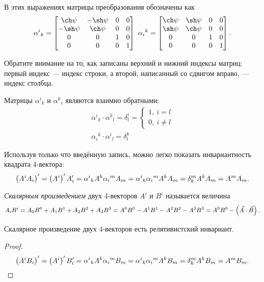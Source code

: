     В этих выражениях матрицы преобразования обозначены как 
    \[
        {\alpha^i}_k = 
        \begin{bmatrix}
            \ch \psi & -\sh\psi & 0 & 0 \\
            -\sh\psi & \ch \psi & 0 & 0 \\
            0 & 0 & 1 & 0 \\
            0 & 0 & 0 & 1
        \end{bmatrix}
        \  {\alpha_i}^k = 
        \begin{bmatrix}
            \ch\psi & \sh\psi & 0 & 0 \\
            \sh\psi & \ch\psi & 0 & 0 \\
            0 & 0 & 1 & 0 \\
            0 & 0 & 0 & 1
        \end{bmatrix}.
    \]
    \begin{note}
        Обратите внимание на то, как записаны верхний и нижний индексы матриц: первый индекс --- индекс строки,
    а второй, написанный со сдвигом вправо, --- индекс столбца.
    \end{note}
    \begin{note}
        Матрицы ${\alpha^i}_k$ и ${\alpha^k}_i$ являются взаимно обратными:
        \begin{gather*}
            {\alpha^i}_k \cdot {\alpha^k}_l = \delta^i_l = \begin{cases} 1, \ i = l \\ 0, \ i \not= l \end{cases} \\
            {\alpha_i}^k \cdot {\alpha^i}_l = \delta^k_l
        \end{gather*}
    \end{note}
    
    Используя только что введённую запись, можно легко показать инвариантность квадрата 4-вектора:
    \[
        \left({A^i A_i}\right)' = \left({A^{i}}\right)' A_i' = {\alpha^i}_k A^k {\alpha_i}^m A_m =
        {\alpha^i}_k {\alpha_i}^m A^k A_m = \delta^m_k A^k A_m = A^m A_m.
    \]

    \begin{Def}
        \textit{Скалярным произведением} двух 4-векторов $A^i$ и $B^i$ называется величина
        \[
            A_i B^i = A_0 B^0 + A_1 B^1 + A_2 B^2 + A_3 B^3 = A^0 B^0 - A^1 B^1 - A^2 B^2 - A^3 B^3 = A^0 B^0 - \left({\vec{A}\cdot\vec{B}}\right).
        \]
    \end{Def}
    \begin{prop}
        Скалярное произведение двух 4-векторов есть релятивистский инвариант.
    \end{prop}
    \begin{proof}
        \[
        \left({A^i B_i}\right)' = \left({A^{i}}\right)' B_i' = {\alpha^i}_k A^k {\alpha_i}^m B_m =
        {\alpha^i}_k {\alpha_i}^m A^k B_m = \delta^m_k A^k B_m = A^m B_m.
        \]
    \end{proof}

